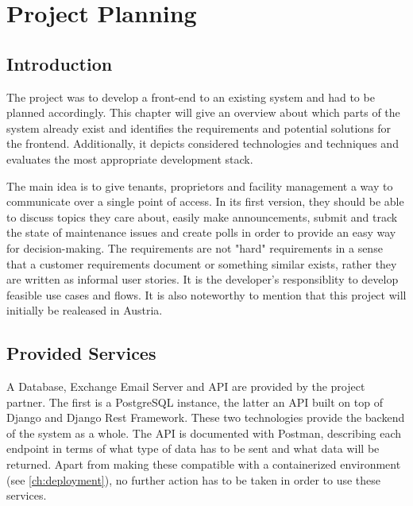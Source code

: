 \chapter[Project Planning]{Project Planning}

\section{Introduction} \label{sec:introplanning}
The project was to develop a front-end to an existing system and had to be planned accordingly. This chapter will give an overview about which parts of the system already exist and identifies the requirements and potential solutions for the frontend. Additionally, it depicts considered technologies and techniques and evaluates the most appropriate development stack.

The main idea is to give tenants, proprietors and facility management a way to communicate over a single point of access. In its first version, they should be able to discuss topics they care about, easily make announcements, submit and track the state of maintenance issues and create polls in order to provide an easy way for decision-making. The requirements are not "hard" requirements in a sense that a customer requirements document or something similar exists, rather they are written as informal user stories. It is the developer's responsiblity to develop feasible use cases and flows. It is also noteworthy to mention that this project will initially be realeased in Austria.

\section{Provided Services}
A Database, Exchange Email Server and API are provided by the project partner. The first is a PostgreSQL instance, the latter an API built on top of Django and Django Rest Framework. These two technologies provide the backend of the system as a whole. The API is documented with Postman, describing each endpoint in terms of what type of data has to be sent and what data will be returned. Apart from making these compatible with a containerized environment (see \autoref{ch:deployment}), no further action has to be taken in order to use these services.


